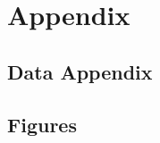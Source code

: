 \documentclass[11pt, oneside]{article}
\begin{document}



\newpage


\newpage
\section{Appendix}
\subsection{Data Appendix}


\newpage
\subsection{Figures}


\newpage
\end{document}
